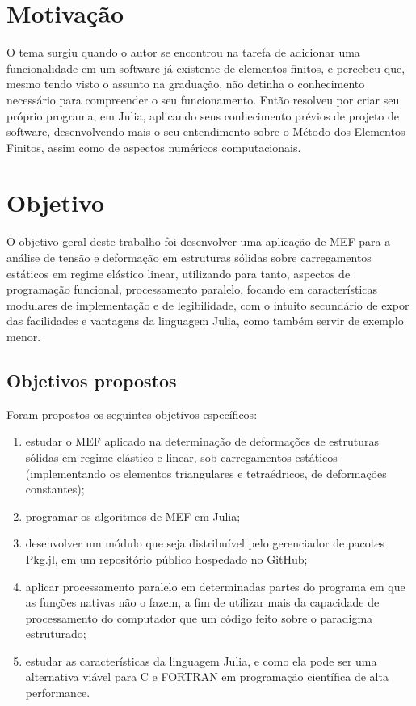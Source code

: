 \section{Motivação}

O tema surgiu quando o autor se encontrou na tarefa de adicionar uma funcionalidade em um software já existente de elementos finitos, e percebeu que, mesmo tendo visto o assunto na graduação, não detinha o conhecimento necessário para compreender o seu funcionamento. Então resolveu por criar seu próprio programa, em Julia, aplicando seus conhecimento prévios de projeto de software, desenvolvendo mais o seu entendimento sobre o Método dos Elementos Finitos, assim como de aspectos numéricos computacionais.


\section{Objetivo}

O objetivo geral deste trabalho foi desenvolver uma aplicação de MEF para a análise de tensão e deformação em estruturas sólidas sobre carregamentos estáticos em regime elástico linear, utilizando para tanto, aspectos de programação funcional, processamento paralelo, focando em características modulares de implementação e de legibilidade, com o intuito secundário de expor das facilidades e vantagens da linguagem Julia, como também servir de exemplo menor.

\subsection{Objetivos propostos}

Foram propostos os seguintes objetivos específicos:

\begin{enumerate}
    \item estudar o MEF aplicado na determinação de deformações de estruturas sólidas em regime elástico e linear, sob carregamentos estáticos (implementando os elementos triangulares e tetraédricos, de deformações constantes);
    \item programar os algoritmos de MEF em Julia;
    \item desenvolver um módulo que seja distribuível pelo gerenciador de pacotes Pkg.jl, em um repositório público hospedado no GitHub;
    \item aplicar processamento paralelo em determinadas partes do programa em que as funções nativas não o fazem, a fim de utilizar mais da capacidade de processamento do computador que um código feito sobre o paradigma estruturado;
    \item estudar as características da linguagem Julia, e como ela pode ser uma alternativa viável para C e FORTRAN em programação científica de alta performance.
\end{enumerate}

